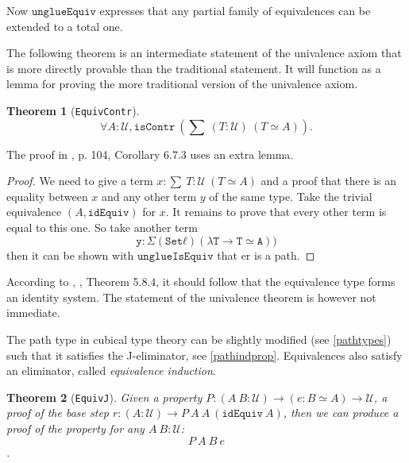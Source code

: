 \documentclass[12pt,a4paper,twoside,xetex]{book}
\newcommand{\keyword}[1]{\emph{#1}\index{#1}}
\newtheorem{theorem}{Theorem}[section]
\newcommand{\op}[1]{\mathtt{#1}}
\newcommand{\type}{\mathcal{U}}
\begin{document}
Now $\op{unglueEquiv}$  expresses that any partial family of equivalences can be extended to a total one.

The following theorem is an intermediate statement of the univalence axiom that is more directly provable than the traditional statement. It will function as a lemma for proving the more traditional version of the univalence axiom.

\begin{theorem}[\texttt{EquivContr}]\label{contrSingl}
 $$\forall A : \type, \op{isContr} \ \left( \sum \ (T : \type) \  \left( T \simeq A \right) \right).$$ 
\end{theorem}


The proof in \cite{Huber2016}, p. 104, Corollary 6.7.3 uses an extra lemma.

\begin{proof}
We need to give a term $x : \sum \ T : \type \  \left( T \simeq A \right)$ and a proof that there is an equality between $x$ and any other term $y$ of the same type. Take the trivial equivalence  $(A, \op{idEquiv})$ for $x$. It remains to prove that every other term is equal to this one. So take another term $$\op{y : Σ (Set ℓ) (λ T → T ≃ A))}$$ then it can be shown with $\op{unglueIsEquiv}$ that er is a path.
\end{proof}


According to \cite{Huber2016}, \cite{Voevodsky2013}, Theorem 5.8.4, it should follow that the equivalence type forms an identity system. The statement of the univalence theorem is however not immediate.

The path type in cubical type theory can be slightly modified (see \cref{pathtypes}) such that it satisfies the J-eliminator, see \cref{pathindprop}. Equivalences also satisfy an eliminator, called \keyword{equivalence induction}. 

\begin{theorem}[\texttt{EquivJ}]
Given a property $P: (A \ B : \mathcal{U}) \rightarrow (e : B \simeq A) \rightarrow \mathcal{U}$, a proof of the base step $r : (A : \mathcal{U}) \rightarrow P \ A\ A \ (\texttt{idEquiv} \ A)$, then we can produce a proof of the property for any $A \ B: \mathcal{U}$: $$ P\  A \ B\ e$$.
\end{theorem}
\end{document}
